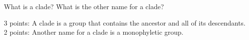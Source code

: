 \question[5]
What is a clade? What is the other name for a clade?

	\begin{solution}
	3 points: A clade is a group that contains the ancestor and all of its descendants.\\
	2 points: Another name for a clade is a monophyletic group.
	\end{solution}


